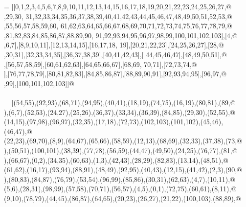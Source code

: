 \documentclass[11pt,oneside]{article}    %
\begin{document}
\begin{flushleft}
\begin{list}{}{}
\mbox{}\verb@FV = [[0,1,2,3,4,5,6,7,8,9,10,11,12,13,14,15,16,17,18,19,20,21,22,23,24,25,26,27,@\\
\mbox{},29,30, 31,32,33,34,35,36,37,38,39,40,41,42,43,44,45,46,47,48,49,50,51,52,53,@\\
\mbox{},55,56,57,58,59,60, 61,62,63,64,65,66,67,68,69,70,71,72,73,74,75,76,77,78,79,@\\
\mbox{},81,82,83,84,85,86,87,88,89,90, 91,92,93,94,95,96,97,98,99,100,101,102,103],[4,@\\
\mbox{},6,7],[8,9,10,11],[12,13,14,15],[16,17,18, 19],[20,21,22,23],[24,25,26,27],[28,@\\
\mbox{},30,31],[32,33,34,35],[36,37,38,39],[40,41,42,43],[ 44,45,46,47],[48,49,50,51],@\\
\mbox{}\verb@[52,53,54,55],[56,57,58,59],[60,61,62,63],[64,65,66,67],[68,69, 70,71],[72,73,74,@\\
\mbox{}],[76,77,78,79],[80,81,82,83],[84,85,86,87],[88,89,90,91],[92,93,94,95],[96,97,@\\
\mbox{},99],[100,101,102,103]]@\\
\mbox{}\verb@@\\
\mbox{}\verb@EV = [(54,55),(92,93),(68,71),(94,95),(40,41),(18,19),(74,75),(16,19),(80,81),(89,@\\
\mbox{}),(6,7),(52,53),(24,27),(25,26),(36,37),(33,34),(36,39),(84,85),(29,30),(52,55),@\\
\mbox{}\verb@(14,15),(97,98),(96,97),(32,35),(17,18),(72,73),(102,103),(101,102),(45,46),(46,47),@\\
\mbox{}\verb@(22,23),(69,70),(8,9),(64,67),(65,66),(58,59),(12,13),(68,69),(32,33),(37,38),(73,@\\
\mbox{}),(50,51),(100,101),(38,39),(77,78),(56,59),(44,47),(49,50),(24,25),(76,77),(81,@\\
\mbox{}),(66,67),(0,2),(34,35),(60,63),(1,3),(42,43),(28,29),(82,83),(13,14),(48,51),@\\
\mbox{}\verb@(61,62),(16,17),(93,94),(88,91),(48,49),(92,95),(40,43),(12,15),(41,42),(2,3),(90,@\\
\mbox{}),(80,83),(84,87),(76,79),(53,54),(96,99),(85,86),(30,31),(62,63),(4,7),(10,11),@\\
\mbox{}\verb@(5,6),(28,31),(98,99),(57,58),(70,71),(56,57),(4,5),(0,1),(72,75),(60,61),(8,11),@\\
\mbox{}\verb@(9,10),(78,79),(44,45),(86,87),(64,65),(20,23),(26,27),(21,22),(100,103),(88,89),@\\

\end{list}
\end{flushleft}
\end{document}
